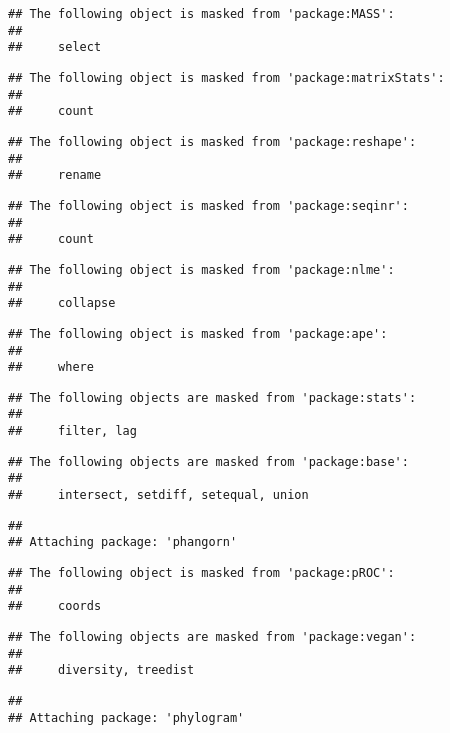 \documentclass[
]{article}
\begin{document}
\begin{verbatim}
## The following object is masked from 'package:MASS':
## 
##     select
\end{verbatim}

\begin{verbatim}
## The following object is masked from 'package:matrixStats':
## 
##     count
\end{verbatim}

\begin{verbatim}
## The following object is masked from 'package:reshape':
## 
##     rename
\end{verbatim}

\begin{verbatim}
## The following object is masked from 'package:seqinr':
## 
##     count
\end{verbatim}

\begin{verbatim}
## The following object is masked from 'package:nlme':
## 
##     collapse
\end{verbatim}

\begin{verbatim}
## The following object is masked from 'package:ape':
## 
##     where
\end{verbatim}

\begin{verbatim}
## The following objects are masked from 'package:stats':
## 
##     filter, lag
\end{verbatim}

\begin{verbatim}
## The following objects are masked from 'package:base':
## 
##     intersect, setdiff, setequal, union
\end{verbatim}

\begin{verbatim}
## 
## Attaching package: 'phangorn'
\end{verbatim}

\begin{verbatim}
## The following object is masked from 'package:pROC':
## 
##     coords
\end{verbatim}

\begin{verbatim}
## The following objects are masked from 'package:vegan':
## 
##     diversity, treedist
\end{verbatim}

\begin{verbatim}
## 
## Attaching package: 'phylogram'
\end{verbatim}
\end{document}
